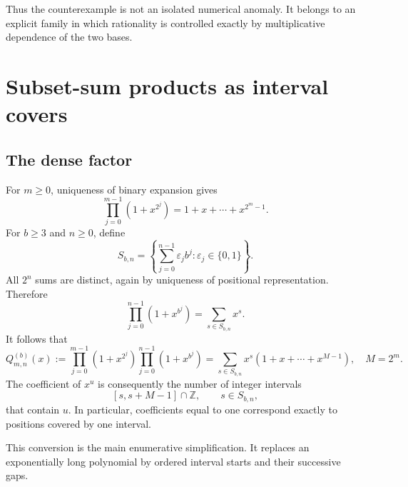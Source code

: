 \documentclass[11pt,letterpaper]{article}
\numberwithin{equation}{section}
\theoremstyle{definition}
\theoremstyle{remark}
\newcommand{\Z}{\mathbb Z}
\begin{document}
Thus the counterexample is not an isolated numerical anomaly. It belongs to an explicit family in which rationality is controlled exactly by multiplicative dependence of the two bases.

\section{Subset-sum products as interval covers}\label{sec:interval}

\subsection{The dense factor}
For $m\ge0$, uniqueness of binary expansion gives
\begin{equation}\label{eq:binary}
 \prod_{j=0}^{m-1}(1+x^{2^j})
 =1+x+\cdots+x^{2^m-1}.
\end{equation}
For $b\ge3$ and $n\ge0$, define
\begin{equation}\label{eq:digitset}
 S_{b,n}=\left\{\sum_{j=0}^{n-1}\varepsilon_j b^j:
 \varepsilon_j\in\{0,1\}\right\}.
\end{equation}
All $2^n$ sums are distinct, again by uniqueness of positional representation. Therefore
\begin{equation}\label{eq:digital}
 \prod_{j=0}^{n-1}(1+x^{b^j})=\sum_{s\in S_{b,n}}x^s.
\end{equation}
It follows that
\begin{equation}\label{eq:mixedproduct}
 Q_{m,n}^{(b)}(x)
 :=\prod_{j=0}^{m-1}(1+x^{2^j})\prod_{j=0}^{n-1}(1+x^{b^j})
 =\sum_{s\in S_{b,n}}x^s(1+x+\cdots+x^{M-1}),\quad M=2^m.
\end{equation}
The coefficient of $x^u$ is consequently the number of integer intervals
\[
 [s,s+M-1]\cap\Z,\qquad s\in S_{b,n},
\]
that contain $u$. In particular, coefficients equal to one correspond exactly to positions covered by one interval.

This conversion is the main enumerative simplification. It replaces an exponentially long polynomial by ordered interval starts and their successive gaps.
\end{document}
